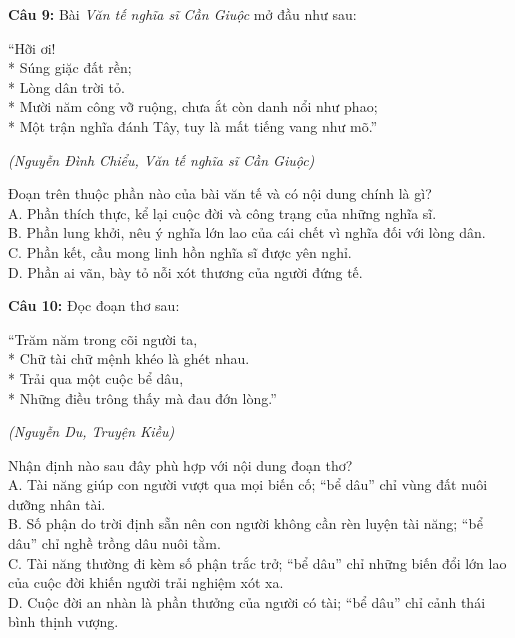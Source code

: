 \documentclass[12pt,a4paper]{article}
\begin{document}


\vspace{0.3cm}

\noindent \textbf{Câu 9:} Bài \textit{Văn tế nghĩa sĩ Cần Giuộc} mở đầu như sau:
\begin{center}
``Hỡi ơi!\\*
Súng giặc đất rền;\\*
Lòng dân trời tỏ.\\*
Mười năm công vỡ ruộng, chưa ắt còn danh nổi như phao;\\*
Một trận nghĩa đánh Tây, tuy là mất tiếng vang như mõ.''
\end{center}
\begin{flushright}\small\textit{(Nguyễn Đình Chiểu, Văn tế nghĩa sĩ Cần Giuộc)}\end{flushright}
Đoạn trên thuộc phần nào của bài văn tế và có nội dung chính là gì?\\
\noindent A. Phần thích thực, kể lại cuộc đời và công trạng của những nghĩa sĩ.\\
\noindent B. Phần lung khởi, nêu ý nghĩa lớn lao của cái chết vì nghĩa đối với lòng dân.\\
\noindent C. Phần kết, cầu mong linh hồn nghĩa sĩ được yên nghỉ.\\
\noindent D. Phần ai vãn, bày tỏ nỗi xót thương của người đứng tế.



\vspace{0.3cm}

\noindent \textbf{Câu 10:} Đọc đoạn thơ sau:
\begin{center}
``Trăm năm trong cõi người ta,\\*
Chữ tài chữ mệnh khéo là ghét nhau.\\*
Trải qua một cuộc bể dâu,\\*
Những điều trông thấy mà đau đớn lòng.''
\end{center}
\begin{flushright}\small\textit{(Nguyễn Du, Truyện Kiều)}\end{flushright}
Nhận định nào sau đây phù hợp với nội dung đoạn thơ?\\
\noindent A. Tài năng giúp con người vượt qua mọi biến cố; ``bể dâu'' chỉ vùng đất nuôi dưỡng nhân tài.\\
\noindent B. Số phận do trời định sẵn nên con người không cần rèn luyện tài năng; ``bể dâu'' chỉ nghề trồng dâu nuôi tằm.\\
\noindent C. Tài năng thường đi kèm số phận trắc trở; ``bể dâu'' chỉ những biến đổi lớn lao của cuộc đời khiến người trải nghiệm xót xa.\\
\noindent D. Cuộc đời an nhàn là phần thưởng của người có tài; ``bể dâu'' chỉ cảnh thái bình thịnh vượng.
\end{document}
